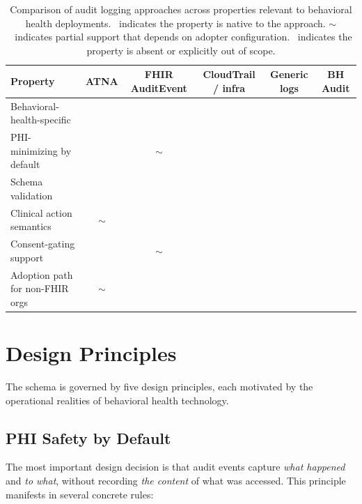 \documentclass[11pt,a4paper]{article}
\newcommand{\cmark}{\ding{51}}
\newcommand{\xmark}{\ding{55}}
\newcommand{\pmark}{$\sim$}
\begin{document}
\begin{table}[H]
\centering
\caption{Comparison of audit logging approaches across properties relevant to behavioral health deployments. \cmark\ indicates the property is native to the approach. \pmark\ indicates partial support that depends on adopter configuration. \xmark\ indicates the property is absent or explicitly out of scope.}
\label{tab:comparison}
\small
\begin{tabularx}{\textwidth}{Xccccc}
\toprule
\textbf{Property} & \textbf{ATNA} & \textbf{FHIR AuditEvent} & \textbf{CloudTrail / infra} & \textbf{Generic logs} & \textbf{BH Audit} \\
\midrule
Behavioral-health-specific & \xmark & \xmark & \xmark & \xmark & \cmark \\
PHI-minimizing by default & \xmark & \pmark & \xmark & \xmark & \cmark \\
Schema validation & \cmark & \cmark & \xmark & \xmark & \cmark \\
Clinical action semantics & \pmark & \cmark & \xmark & \xmark & \cmark \\
Consent-gating support & \xmark & \pmark & \xmark & \xmark & \cmark \\
Adoption path for non-FHIR orgs & \pmark & \xmark & \cmark & \cmark & \cmark \\
\bottomrule
\end{tabularx}
\end{table}

\section{Design Principles}

The schema is governed by five design principles, each motivated by the operational realities of behavioral health technology.

\subsection{PHI Safety by Default}

The most important design decision is that audit events capture \textit{what happened} and \textit{to what}, without recording \textit{the content} of what was accessed. This principle manifests in several concrete rules:
\end{document}
